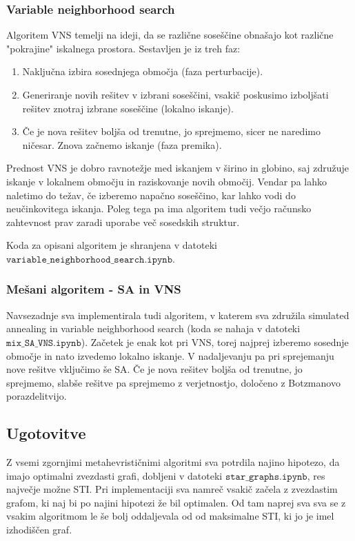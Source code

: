 \documentclass[a4paper,12pt]{article}
\begin{document}
\subsubsection{Variable neighborhood search}
Algoritem VNS temelji na ideji, da se različne soseščine obnašajo kot različne "pokrajine" iskalnega prostora. Sestavljen je iz treh faz:
\begin{enumerate}
      \item Naključna izbira sosednjega območja (faza perturbacije).
      \item Generiranje novih rešitev v izbrani soseščini, vsakič poskusimo izboljšati rešitev znotraj izbrane soseščine (lokalno iskanje).
      \item Če je nova rešitev boljša od trenutne, jo sprejmemo, sicer ne naredimo ničesar. Znova začnemo iskanje (faza premika).
\end{enumerate}
Prednost VNS je dobro ravnotežje med iskanjem v širino in globino, saj združuje iskanje v lokalnem območju in raziskovanje novih območij. Vendar
pa lahko naletimo do težav, če izberemo napačno soseščino, kar lahko vodi do neučinkovitega iskanja. Poleg tega pa ima algoritem tudi večjo
računsko zahtevnost prav zaradi uporabe več sosedskih struktur.

Koda za opisani algoritem je shranjena v datoteki \\$\texttt{variable\_neighborhood\_search.ipynb}$.

\subsubsection{Mešani algoritem - SA in VNS}
Navsezadnje sva implementirala tudi algoritem, v katerem sva združila simulated annealing in variable neighborhood search (koda se nahaja
v datoteki $\texttt{mix\_SA\_VNS.ipynb}$). Začetek je enak kot pri VNS, torej najprej izberemo sosednje območje in nato izvedemo lokalno iskanje. 
V nadaljevanju pa pri sprejemanju nove rešitve vključimo še SA. Če je nova rešitev boljša od trenutne, jo sprejmemo, slabše rešitve pa sprejmemo
z verjetnostjo, določeno z Botzmanovo porazdelitvijo. 

\subsection{Ugotovitve}
Z vsemi zgornjimi metahevrističnimi algoritmi sva potrdila najino hipotezo, da imajo optimalni zvezdasti grafi, dobljeni v datoteki 
$\texttt{star\_graphs.ipynb}$, res največje možne STI. Pri implementaciji sva namreč vsakič začela z zvezdastim grafom, ki naj 
bi po najini hipotezi že bil optimalen. Od tam naprej sva sva se z vsakim algoritmom le še bolj oddaljevala od od maksimalne STI, ki
jo je imel izhodiščen graf. 

\nocite{Luke2013Metaheuristics}

\newpage


      
\end{document}
